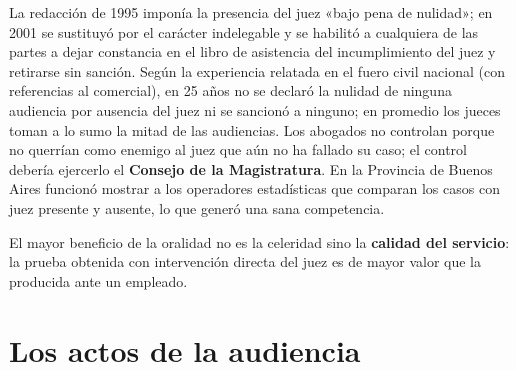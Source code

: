 \documentclass[12pt,oneside]{book}
\begin{document}
La redacción de 1995 imponía la presencia del juez «bajo pena de nulidad»; en 2001 se sustituyó por el carácter indelegable y se habilitó a cualquiera de las partes a dejar constancia en el libro de asistencia del incumplimiento del juez y retirarse sin sanción. %
Según la experiencia relatada en el fuero civil nacional (con referencias al comercial), en 25 años no se declaró la nulidad de ninguna audiencia por ausencia del juez ni se sancionó a ninguno; en promedio los jueces toman a lo sumo la mitad de las audiencias. Los abogados no controlan porque no querrían como enemigo al juez que aún no ha fallado su caso; el control debería ejercerlo el \textbf{Consejo de la Magistratura}. En la Provincia de Buenos Aires funcionó mostrar a los operadores estadísticas que comparan los casos con juez presente y ausente, lo que generó una sana competencia.

\begin{important}
El mayor beneficio de la oralidad no es la celeridad sino la \textbf{calidad del servicio}: la prueba obtenida con intervención directa del juez es de mayor valor que la producida ante un empleado.
\end{important}

\section{Los actos de la audiencia}
\end{document}
